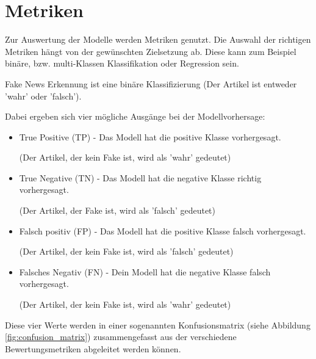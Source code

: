 \section{Metriken}


Zur Auswertung der Modelle werden Metriken genutzt. Die Auswahl der richtigen Metriken hängt von der gewünschten Zielsetzung ab.
Diese kann zum Beispiel binäre, bzw. multi-Klassen Klassifikation oder Regression sein.

Fake News Erkennung ist eine binäre Klassifizierung (Der Artikel ist entweder 'wahr' oder 'falsch').

Dabei ergeben sich vier mögliche Ausgänge bei der Modellvorhersage:
\begin{itemize}
    \item True Positive (TP) - Das Modell hat die positive Klasse vorhergesagt. 
        
    (Der Artikel, der kein Fake ist, wird als 'wahr' gedeutet)
    \item True Negative (TN) - Das Modell hat die negative Klasse richtig vorhergesagt.
        
    (Der Artikel, der Fake ist, wird als 'falsch' gedeutet)
    \item Falsch positiv (FP) - Das Modell hat die positive Klasse falsch vorhergesagt. 
        
    (Der Artikel, der kein Fake ist, wird als 'falsch' gedeutet)
    \item Falsches Negativ (FN) - Dein Modell hat die negative Klasse falsch vorhergesagt. 
        
    (Der Artikel, der kein Fake ist, wird als 'wahr' gedeutet)
\end{itemize}

Diese vier Werte werden in einer sogenannten Konfusionsmatrix  (siehe Abbildung \ref{fig:confusion_matrix}) zusammengefasst
aus der verschiedene Bewertungsmetriken abgeleitet werden können.

